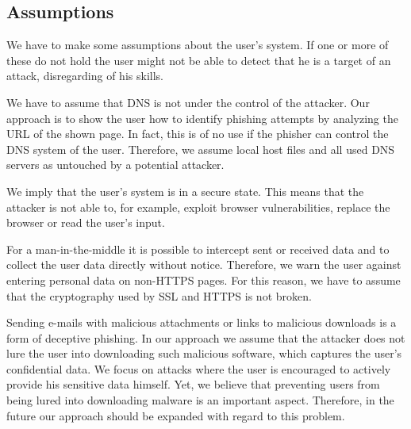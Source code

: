 \subsection{Assumptions}
\label{s:assumptions}
We have to make some assumptions about the user's system. 
If one or more of these do not hold the user might not be able to detect that he is a target of an attack, disregarding of his skills.
\begin{description}[leftmargin=0cm]
	\item[Secure DNS:] We have to assume that DNS is not under the control of the attacker.
	Our approach is to show the user how to identify phishing attempts by analyzing the URL of the shown page.
	In fact, this is of no use if the phisher can control the DNS system of the user.
	Therefore, we assume local host files and all used DNS servers as untouched by a potential attacker.
	\item[Secure Smartphone:] We imply that the user's system is in a secure state.
	This means that the attacker is not able to, for example, exploit browser vulnerabilities, replace the browser or read the user's input.
	\item[Secure SSL:] 
	For a man-in-the-middle it is possible to intercept sent or received data and to collect the user data directly without notice.
	Therefore, we warn the user against entering personal data on non-HTTPS pages.
	For this reason, we have to assume that the cryptography used by SSL and HTTPS is not broken.
	\item[Malware:] 
	Sending e-mails with malicious attachments or links to malicious downloads is a form of deceptive phishing.
	In our approach we assume that the attacker does not lure the user into downloading such malicious software, which captures the user's confidential data.
	We focus on attacks where the user is encouraged to actively provide his sensitive data himself.
	Yet, we believe that preventing users from being lured into downloading malware is an important aspect.
	Therefore, in the future our approach should be expanded with regard to this problem.
\end{description}

